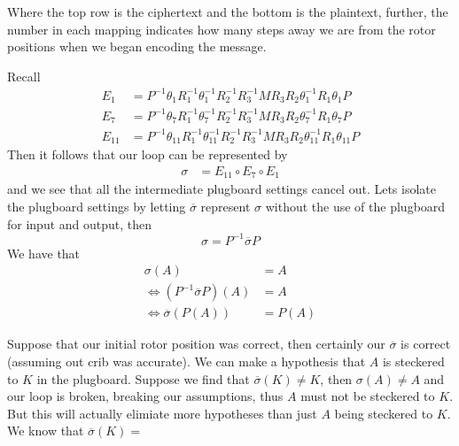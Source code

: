 Where the top row is the ciphertext and the bottom is the plaintext, further, the number in each mapping indicates how many steps away we are from the rotor 
positions when we began encoding the message.

\begin{center}
\end{center}

Recall
\begin{align*}
    E_1 &= P^{-1}\theta_1R_1^{-1}\theta_1^{-1}R_2^{-1}R_3^{-1}MR_3R_2\theta_1^{-1}R_1\theta_1P
    \\E_7 &= P^{-1}\theta_7R_1^{-1}\theta_7^{-1}R_2^{-1}R_3^{-1}MR_3R_2\theta_7^{-1}R_1\theta_7P
    \\E_{11} &= P^{-1}\theta_{11}R_1^{-1}\theta_{11}^{-1}R_2^{-1}R_3^{-1}MR_3R_2\theta_{11}^{-1}R_1\theta_{11}P
\end{align*}
Then it follows that our loop can be represented by 
\begin{align*}
    \sigma &= E_{11}\circ E_7 \circ E_{1}
\end{align*}
and we see that all the intermediate plugboard settings cancel out. Lets isolate the plugboard settings by letting 
$\overline{\sigma}$ represent $\sigma$ without the use of the plugboard for input and output, then 
\[
    \sigma = P^{-1}\overline{\sigma}P
\]
We have that
\begin{align*}
    \sigma(A) &= A
    \\\iff (P^{-1}\overline{\sigma}P)(A) &= A
    \\\iff \overline{\sigma}(P(A)) &= P(A)
\end{align*}

Suppose that our initial rotor position was correct, then certainly our $\overline{\sigma}$ is correct (assuming out crib was accurate). We can make a hypothesis 
that $A$ is steckered to $K$ in the plugboard. Suppose we find that $\overline{\sigma}(K) \ne K$, then $\sigma(A)\ne A$ and our loop is broken, breaking our assumptions, thus $A$ must not be steckered to $K$.
But this will actually elimiate more hypotheses than just $A$ being steckered to $K$. We know that $\overline{\sigma}(K) =$

